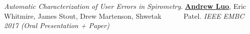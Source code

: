 \begin{cventries}
  \vspace{-1.5em}
  \cventry
    {}
    {}
    {}
    {}
    {\textit{Automatic Characterization of User Errors in Spirometry}. \underline{\textbf{Andrew Luo}}, Eric Whitmire,
 James Stout, Drew Martenson, Shwetak \textcolor{white}{aaaaa} Patel. \textit{IEEE} \textit{EMBC 2017 (Oral Presentation + Paper)}}
\vspace{-1em}
\end{cventries}


